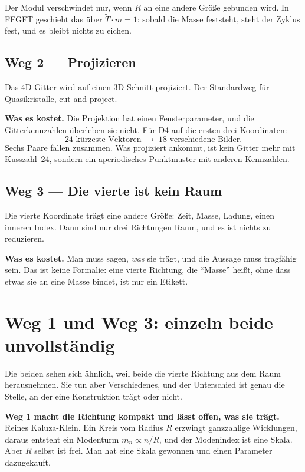 \documentclass[11pt]{report}
\begin{document}
Der Modul verschwindet nur, wenn $R$ an eine andere Größe gebunden
wird. In FFGFT geschieht das über $\tilde T \cdot m = 1$: sobald die
Masse feststeht, steht der Zyklus fest, und es bleibt nichts zu eichen.

\section{Weg 2 --- Projizieren}

Das 4D-Gitter wird auf einen 3D-Schnitt projiziert. Der Standardweg für
Quasikristalle, cut-and-project.

\textbf{Was es kostet.} Die Projektion hat einen Fensterparameter, und
die Gitterkennzahlen überleben sie nicht. Für D4 auf die ersten drei
Koordinaten:
\[
  24 \text{ kürzeste Vektoren} \;\longrightarrow\; 18 \text{ verschiedene Bilder.}
\]
Sechs Paare fallen zusammen. Was projiziert ankommt, ist kein Gitter
mehr mit Kusszahl~24, sondern ein aperiodisches Punktmuster mit anderen
Kennzahlen.

\section{Weg 3 --- Die vierte ist kein Raum}

Die vierte Koordinate trägt eine andere Größe: Zeit, Masse, Ladung,
einen inneren Index. Dann sind nur drei Richtungen Raum, und es ist
nichts zu reduzieren.

\textbf{Was es kostet.} Man muss sagen, \emph{was} sie trägt, und die
Aussage muss tragfähig sein. Das ist keine Formalie: eine vierte
Richtung, die \enquote{Masse} heißt, ohne dass etwas sie an eine Masse
bindet, ist nur ein Etikett.

\chapter{Weg 1 und Weg 3: einzeln beide unvollständig}

Die beiden sehen sich ähnlich, weil beide die vierte Richtung aus dem
Raum herausnehmen. Sie tun aber Verschiedenes, und der Unterschied ist
genau die Stelle, an der eine Konstruktion trägt oder nicht.

\textbf{Weg 1 macht die Richtung kompakt und lässt offen, was sie
trägt.} Reines Kaluza-Klein. Ein Kreis vom Radius $R$ erzwingt
ganzzahlige Wicklungen, daraus entsteht ein Modenturm
$m_n \propto n/R$, und der Modenindex ist eine Skala. Aber $R$ selbst
ist frei. Man hat eine Skala gewonnen und einen Parameter dazugekauft.
\end{document}
